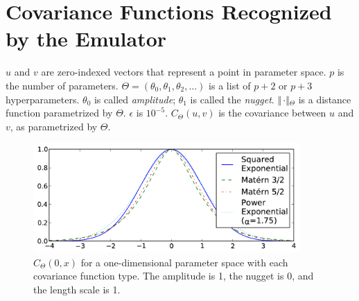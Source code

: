 
\section{Covariance Functions Recognized by the Emulator}
\label{sec:CovarianceFunctions}

$u$ and $v$ are zero-indexed vectors that represent a point in parameter space.  $p$ is the number of parameters. $\Theta=(\theta_0, \theta_1,\theta_2,\ldots)$ is a list of $p+2$ or $p+3$ hyperparameters. $\theta_0$ is called \emph{amplitude}; $\theta_1$ is called the \emph{nugget}.  $\Vert\,\cdotp\Vert{}_\Theta$ is a distance function parametrized by $\Theta$.  $\epsilon$ is $10^{-5}$. $C_\Theta{}(u, v)$ is the covariance between $u$ and $v$, as parametrized by $\Theta$.


\begin{figure}[b]
\includegraphics[width=4in]{figs/kernel_functions.pdf}
\parbox[b]{2.5in}
{\caption{\label{fig:kernelfunctions}
$C_\Theta{}(0, x)$ for a one-dimensional parameter space with each covariance function type. The amplitude is 1, the nugget is 0, and the length scale is 1.
\vspace*{30pt}
}}
\end{figure}



